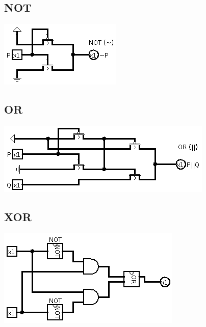 \documentclass[12pt, letterpaper]{article}
\begin{document}
      \subsection*{NOT}

        \begin{center}
          \includegraphics[scale=0.4]{not.png}
        \end{center}

      \subsection*{OR}

        \begin{center}
          \includegraphics[scale=0.4]{or.png}
        \end{center}

      \subsection*{XOR}

        \begin{center}
          \includegraphics[scale=0.4]{xor.png}
        \end{center}
\end{document}

